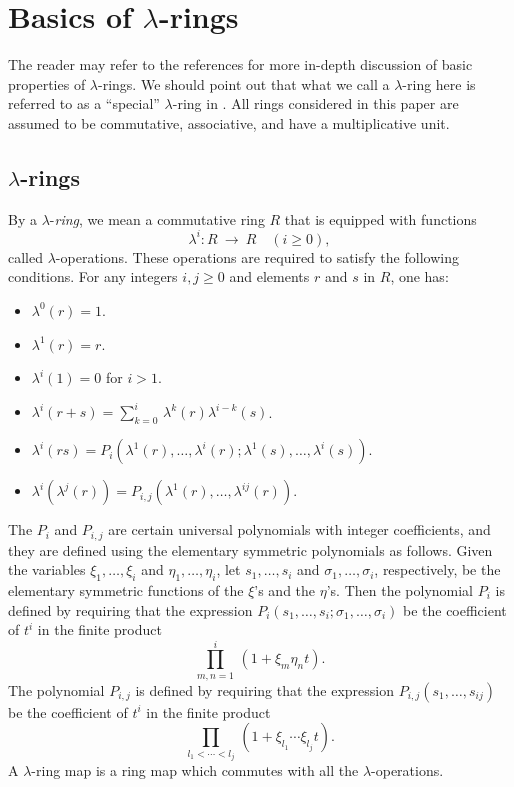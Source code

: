 \documentclass[reqno,11pt]{amsart}
\numberwithin{equation}{subsection}  %
\begin{document}

\section{Basics of $\lambda$-rings}
\label{sec:basics}


The reader may refer to the references \cite{at,knutson} for more in-depth discussion of basic properties of $\lambda$-rings.  We should point out that what we call a $\lambda$-ring here is referred to as a ``special'' $\lambda$-ring in \cite{at}.  All rings considered in this paper are assumed to be commutative, associative, and have a multiplicative unit.





\subsection{$\lambda$-rings}
\label{subsec:lambda-rings}


By a $\lambda$-\emph{ring}, we mean a commutative ring $R$ that is equipped with functions
   \[
   \lambda^i \colon R ~\to~ R \quad (i \geq 0),
   \]
called $\lambda$-operations.  These operations are required to satisfy the following conditions.  For any integers $i, j \geq 0$ and elements $r$ and $s$ in $R$, one has:
   \begin{itemize}
   \item $\lambda^0(r) = 1$.
   \item $\lambda^1(r) = r$.
   \item $\lambda^i(1) = 0$ for $i > 1$.
   \item $\lambda^i(r + s) = \sum_{k = 0}^i\, \lambda^k(r)\lambda^{i-k}(s)$.
   \item $\lambda^i(rs) = P_i(\lambda^1(r), \ldots , \lambda^i(r); \lambda^1(s), \ldots, \lambda^i(s))$.
   \item $\lambda^i(\lambda^j(r)) = P_{i,j}(\lambda^1(r), \ldots , \lambda^{ij}(r))$.
   \end{itemize}
The $P_i$ and $P_{i,j}$ are certain universal polynomials with integer coefficients, and they are defined using the elementary symmetric polynomials as follows.  Given the variables $\xi_1, \ldots , \xi_i$ and $\eta_1, \ldots , \eta_i$, let $s_1, \ldots , s_i$ and $\sigma_1, \ldots , \sigma_i$, respectively, be the elementary symmetric functions of the $\xi$'s and the $\eta$'s.  Then the polynomial $P_i$ is defined by requiring that the expression 
$P_i(s_1, \ldots , s_i; \sigma_1, \ldots , \sigma_i)$ 
be the coefficient of $t^i$ in the finite product
   \[
   \prod_{m,n=1}^i\, (1 + \xi_m \eta_n t).
   \]
The polynomial $P_{i,j}$ is defined by requiring that the expression 
$P_{i,j}(s_1, \ldots , s_{ij})$ 
be the coefficient of $t^i$ in the finite product
   \[
   \prod_{l_1 < \cdots < l_j} \, (1 + \xi_{l_1} \cdots \xi_{l_j} t).
   \]
A $\lambda$-ring map is a ring map which commutes with all the $\lambda$-operations.
\end{document}

